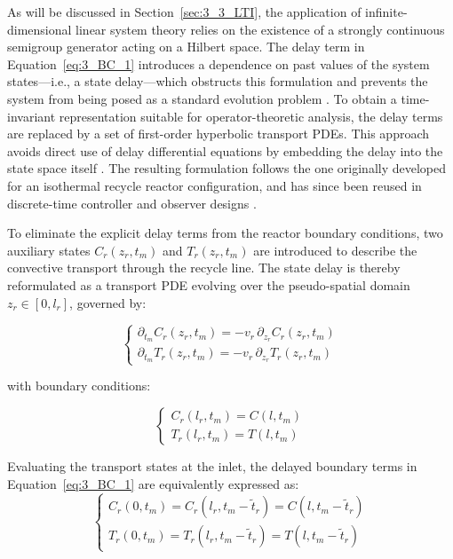 As will be discussed in Section~\ref{sec:3_3_LTI}, the application of infinite-dimensional linear system theory relies on the existence of a strongly continuous semigroup generator acting on a Hilbert space. The delay term in Equation~\eqref{eq:3_BC_1} introduces a dependence on past values of the system states—i.e., a state delay—which obstructs this formulation and prevents the system from being posed as a standard evolution problem \autocite{Curtain2020Introduction}. To obtain a time-invariant representation suitable for operator-theoretic analysis, the delay terms are replaced by a set of first-order hyperbolic transport PDEs. This approach avoids direct use of delay differential equations by embedding the delay into the state space itself \autocite{Krstic2009Delay}. The resulting formulation follows the one originally developed for an isothermal recycle reactor configuration, and has since been reused in discrete-time controller and observer designs \autocite{moadeli2025optimal,Moadeli2025Model,Moadeli2025Observer}.

To eliminate the explicit delay terms from the reactor boundary conditions, two auxiliary states $C_r(z_r, t_m)$ and $T_r(z_r, t_m)$ are introduced to describe the convective transport through the recycle line. The state delay is thereby reformulated as a transport PDE evolving over the pseudo-spatial domain $z_r \in [0, l_r]$, governed by:

\begin{equation} \label{eq:3_transport_PDE}
    \begin{cases}
        \partial_{t_m} C_r(z_r, t_m) = - v_r \, \partial_{z_r} C_r(z_r, t_m) \\
        \partial_{t_m} T_r(z_r, t_m) = - v_r \, \partial_{z_r} T_r(z_r, t_m)
    \end{cases}
\end{equation}

with boundary conditions:

\begin{equation} \label{eq:3_transport_BC}
    \begin{cases}
        C_r(l_r, t_m) = C(l, t_m) \\
        T_r(l_r, t_m) = T(l, t_m)
    \end{cases}
\end{equation}

Evaluating the transport states at the inlet, the delayed boundary terms in Equation~\eqref{eq:3_BC_1} are equivalently expressed as:
\begin{equation} \label{eq:3_delay_identity}
    \begin{cases}
        C_r(0, t_m) = C_r(l_r, t_m - \tilde{t}_r) = C(l, t_m - \tilde{t}_r) \\
        T_r(0, t_m) = T_r(l_r, t_m - \tilde{t}_r) = T(l, t_m - \tilde{t}_r)
    \end{cases}
\end{equation}

